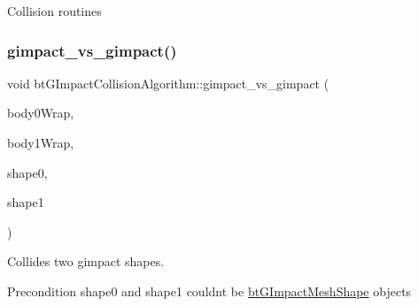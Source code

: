 Collision routines \mbox{\label{classbtGImpactCollisionAlgorithm_a2a6bd5ca4d26e3578d2613543e85429b}} 
\subsubsection{\texorpdfstring{gimpact\+\_\+vs\+\_\+gimpact()}{gimpact\_vs\_gimpact()}\hspace{0.1cm}{\footnotesize\ttfamily [1/2]}}
{\footnotesize\ttfamily void bt\+G\+Impact\+Collision\+Algorithm\+::gimpact\+\_\+vs\+\_\+gimpact (\begin{DoxyParamCaption}\item[{const \hyperlink{structbtCollisionObjectWrapper}{bt\+Collision\+Object\+Wrapper} $\ast$}]{body0\+Wrap,  }\item[{const \hyperlink{structbtCollisionObjectWrapper}{bt\+Collision\+Object\+Wrapper} $\ast$}]{body1\+Wrap,  }\item[{const \hyperlink{classbtGImpactShapeInterface}{bt\+G\+Impact\+Shape\+Interface} $\ast$}]{shape0,  }\item[{const \hyperlink{classbtGImpactShapeInterface}{bt\+G\+Impact\+Shape\+Interface} $\ast$}]{shape1 }\end{DoxyParamCaption})}



Collides two gimpact shapes. 

\begin{DoxyPrecond}{Precondition}
shape0 and shape1 couldn\textquotesingle{}t be \hyperlink{classbtGImpactMeshShape}{bt\+G\+Impact\+Mesh\+Shape} objects 
\end{DoxyPrecond}
\mbox{\label{classbtGImpactCollisionAlgorithm_a2a6bd5ca4d26e3578d2613543e85429b}} 
